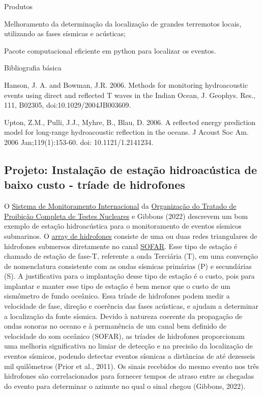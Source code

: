 \documentclass[10pt,a4paper,oneside]{book}
\begin{document}
\begin{fancyenum}{\faShoppingCart}{Produtos}
	\item Melhoramento da determinação da localização de grandes terremotos locais, utilizando as fases sísmicas e acústicas;
	\item Pacote computacional eficiente em python para localizar os eventos.
\end{fancyenum}

\begin{fancyenum}{\faBook}{Bibliografia básica}
	\item Hanson, J. A. and Bowman, J.R.  2006. Methods for monitoring hydroacoustic events using direct and reflected T waves in the Indian Ocean, J. Geophys. Res., 111, B02305, doi:10.1029/2004JB003609.
	\item Upton, Z.M., Pulli, J.J., Myhre, B., Blau, D. 2006. A reflected energy prediction model for long-range hydroacoustic reflection in the oceans. J Acoust Soc Am. 2006 Jan;119(1):153-60. doi: 10.1121/1.2141234.
\end{fancyenum}

\subsection{Projeto: Instalação de estação hidroacústica de baixo custo - tríade de hidrofones}

O \href{https://www.ctbto.org/our-work/international-monitoring-system}{Sistema de Monitoramento Internacional} da \href{https://funag.gov.br/biblioteca/download/934-Tratado_de_Proibicao_Completa_dos_Testes_Nucleares_CTBT.pdf}{Organização do Tratado de Proibição Completa de Testes Nucleares} e Gibbons (2022) descrevem um bom exemplo de estação hidroacústica para o monitoramento de eventos sísmicos submarinos. O \href{https://www.ctbto.org/our-work/monitoring-technologies/hydroacoustic-monitoring}{array de hidrofones} consiste de uma ou duas redes triangulares de hidrofones submersos diretamente no canal \href{https://pt.wikipedia.org/wiki/Canal_SOFAR}{SOFAR}. Esse tipo de estação é chamado de estação de fase-T, referente a onda Terciária (T), em uma convenção de nomenclatura consistente com as ondas sísmicas primárias (P) e secundárias (S). A justificativa para o implantação desse tipo de estação é o custo, pois para implantar e manter esse tipo de estação é bem menor que o custo de um sismômetro de fundo oceânico. Essa tríade de hidrofones podem medir a velocidade de fase, direção e coerência das fases acústicas, e ajudam a determinar a localização da fonte sísmica. Devido à natureza coerente da propagação de ondas sonoras no oceano e à permanência de um canal bem definido de velocidade do som oceânico (SOFAR), as tríades de hidrofones proporcionam uma melhoria significativa no limiar de detecção e na precisão da localização de eventos sísmicos, podendo detectar eventos sísmicas a distâncias de até dezesseis mil quilômetros (Prior et al., 2011). Os sinais recebidos do mesmo evento nos três hidrofones são correlacionados para fornecer tempos de atraso entre as chegadas do evento para determinar o azimute no qual o sinal chegou (Gibbons, 2022).
\end{document}
